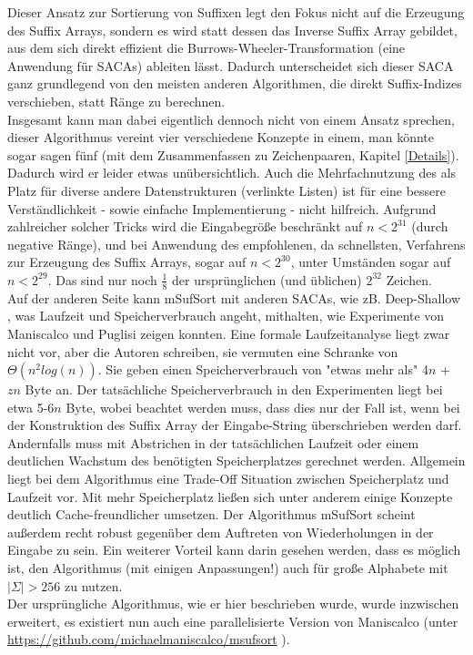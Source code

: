 Dieser Ansatz zur Sortierung von Suffixen legt den Fokus nicht auf die Erzeugung des Suffix Arrays, sondern es wird statt dessen das Inverse Suffix Array gebildet, aus dem sich direkt effizient die Burrows-Wheeler-Transformation (eine Anwendung für SACAs) ableiten lässt.
Dadurch unterscheidet sich dieser SACA ganz grundlegend von den meisten anderen Algorithmen, die direkt Suffix-Indizes verschieben, statt Ränge zu berechnen.\\
Insgesamt kann man dabei eigentlich dennoch nicht von einem Ansatz sprechen, dieser Algorithmus vereint vier verschiedene Konzepte in einem, man könnte sogar sagen fünf (mit dem Zusammenfassen zu Zeichenpaaren, Kapitel \ref{Details}). Dadurch wird er leider etwas unübersichtlich. Auch die Mehrfachnutzung des \isa als Platz für diverse andere Datenstrukturen (verlinkte Listen) ist für eine bessere Verständlichkeit - sowie einfache Implementierung - nicht hilfreich. Aufgrund zahlreicher solcher Tricks wird die Eingabegröße beschränkt auf $n < 2^{31}$  (durch negative Ränge), und bei Anwendung des empfohlenen, da schnellsten, Verfahrens zur Erzeugung des Suffix Arrays, sogar auf $n < 2^{30}$, unter Umständen sogar auf $n < 2^{29}$. Das sind nur noch $\frac{1}{8}$ der ursprünglichen (und üblichen) $2^{32}$ Zeichen.\\
Auf der anderen Seite kann mSufSort mit anderen SACAs, wie zB. Deep-Shallow \cite{saca:4}, was Laufzeit und Speicherverbrauch angeht, mithalten, wie Experimente von Maniscalco und Puglisi zeigen konnten. Eine formale Laufzeitanalyse liegt zwar nicht vor, aber die Autoren schreiben, sie vermuten eine Schranke von $\Theta(n^2 log(n))$. Sie geben einen Speicherverbrauch von "etwas mehr als" 4$n$ + $zn$ Byte an. Der tatsächliche Speicherverbrauch in den Experimenten liegt bei etwa 5-6$n$ Byte, wobei beachtet werden muss, dass dies nur der Fall ist, wenn bei der Konstruktion des Suffix Array der Eingabe-String überschrieben werden darf. Andernfalls muss mit Abstrichen in der tatsächlichen Laufzeit oder einem deutlichen Wachstum des benötigten Speicherplatzes gerechnet werden. Allgemein liegt bei dem Algorithmus eine Trade-Off Situation zwischen Speicherplatz und Laufzeit vor. Mit mehr Speicherplatz ließen sich unter anderem einige Konzepte deutlich Cache-freundlicher umsetzen.
Der Algorithmus mSufSort scheint außerdem recht robust gegenüber dem Auftreten von Wiederholungen in der Eingabe zu sein. Ein weiterer Vorteil kann darin gesehen werden, dass es möglich ist, den Algorithmus (mit einigen Anpassungen!) auch für große Alphabete mit $|\Sigma| > 256$ zu nutzen.\\
Der ursprüngliche Algorithmus, wie er hier beschrieben wurde, wurde inzwischen erweitert, es existiert nun auch eine parallelisierte Version von Maniscalco (unter \url{https://github.com/michaelmaniscalco/msufsort} ).

